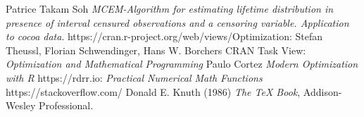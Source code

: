 \documentclass[12pt,a4paper]{scrbook}
\begin{document}
	\begin{thebibliography}{1}
			Patrice Takam Soh \textit{MCEM-Algorithm for estimating lifetime distribution in
presence of interval censured observations and a censoring
variable. Application to cocoa data}.
			https://cran.r-project.org/web/views/Optimization:	Stefan Theussl, Florian Schwendinger, Hans W. Borchers
			CRAN Task View: \textit{Optimization and Mathematical Programming}
			Paulo Cortez \textit{Modern Optimization with R}
			https://rdrr.io: \textit{Practical Numerical Math Functions}
			https://stackoverflow.com/
			Donald E. Knuth (1986) \emph{The \TeX{} Book}, Addison-Wesley Professional.
	\end{thebibliography}
\end{document}
